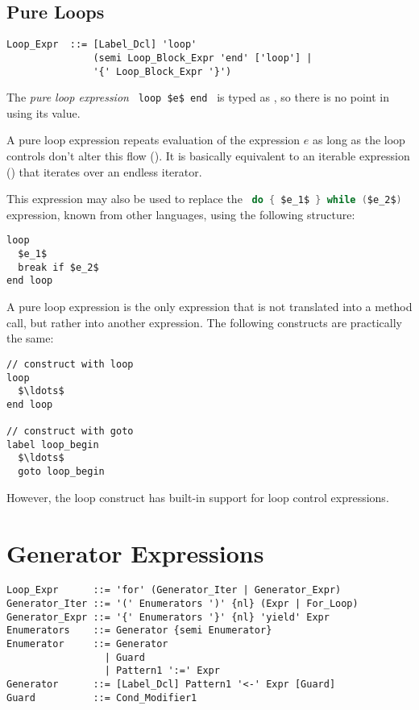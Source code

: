 \subsection{Pure Loops}
\label{sec:pure-loops}

\syntax\begin{lstlisting}
Loop_Expr  ::= [Label_Dcl] 'loop'
               (semi Loop_Block_Expr 'end' ['loop'] | 
               '{' Loop_Block_Expr '}')
\end{lstlisting}

The {\em pure loop expression} ~\lstinline!loop $e$ end!~ is typed as , so there is no point in using its value. 

A pure loop expression repeats evaluation of the expression $e$ as long as the loop controls don't alter this flow (). It is basically equivalent to an iterable expression () that iterates over an endless iterator. 

This expression may also be used to replace the ~\lstinline[language=Java]!do { $e_1$ } while ($e_2$)!~ expression, known from other languages, using the following structure: 
\begin{lstlisting}
loop
  $e_1$
  break if $e_2$
end loop
\end{lstlisting}

A pure loop expression is the only expression that is not translated into a method call, but rather into another expression. The following constructs are practically the same: 
\begin{lstlisting}
// construct with loop
loop
  $\ldots$
end loop

// construct with goto
label loop_begin
  $\ldots$
  goto loop_begin
\end{lstlisting}
However, the loop construct has built-in support for loop control expressions. 





\section{Generator Expressions}
\label{sec:generator-expressions}

\syntax\begin{lstlisting}
Loop_Expr      ::= 'for' (Generator_Iter | Generator_Expr)
Generator_Iter ::= '(' Enumerators ')' {nl} (Expr | For_Loop)
Generator_Expr ::= '{' Enumerators '}' {nl} 'yield' Expr
Enumerators    ::= Generator {semi Enumerator}
Enumerator     ::= Generator
                 | Guard
                 | Pattern1 ':=' Expr
Generator      ::= [Label_Dcl] Pattern1 '<-' Expr [Guard]
Guard          ::= Cond_Modifier1
\end{lstlisting}

